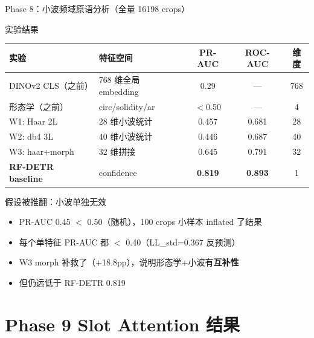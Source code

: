 \documentclass[aspectratio=169, 10pt]{beamer}
\begin{document}
\begin{frame}{Phase 8：小波频域原语分析（全量 16198 crops）}
  \begin{block}{实验结果}
    \begin{tabular}{llccc}
      \toprule
      \textbf{实验} & \textbf{特征空间} & \textbf{PR-AUC} & \textbf{ROC-AUC} & \textbf{维度} \\
      \midrule
      DINOv2 CLS（之前） & 768 维全局 embedding & 0.29 & — & 768 \\
      形态学（之前） & circ/solidity/ar & $<$0.50 & — & 4 \\
      \midrule
      W1: Haar 2L & 28 维小波统计 & \alert{0.457} & 0.681 & 28 \\
      W2: db4 3L & 40 维小波统计 & \alert{0.446} & 0.687 & 40 \\
      W3: haar+morph & 32 维拼接 & 0.645 & 0.791 & 32 \\
      \midrule
      \textbf{RF-DETR baseline} & confidence & \textbf{0.819} & \textbf{0.893} & 1 \\
      \bottomrule
    \end{tabular}
  \end{block}
  \vspace{0em}
  \begin{alertblock}{假设被推翻：小波单独无效}
    \begin{itemize}
      \item PR-AUC 0.45 $<$ 0.50（随机），100 crops 小样本 inflated 了结果
      \item 每个单特征 PR-AUC 都 $<$ 0.40（LL\_std=0.367 反预测）
      \item W3 morph 补救了（+18.8pp），说明形态学+小波有\textbf{互补性}
      \item 但仍远低于 RF-DETR 0.819
    \end{itemize}
  \end{alertblock}
\end{frame}


\section{Phase 9 Slot Attention 结果}
\end{document}
